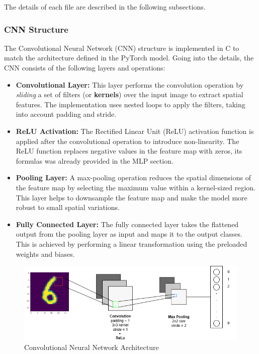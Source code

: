 \documentclass{article}
\begin{document}
The details of each file are described in the following subsections.

\subsubsection{CNN Structure}
The Convolutional Neural Network (CNN) structure is implemented in C to match the architecture defined in the PyTorch model. Going into the details, the CNN consists of the following layers and operations:

\begin{itemize}
    \item \textbf{Convolutional Layer:} This layer performs the convolution operation by \textit{sliding} a set of filters (or \textbf{kernels}) over the input image to extract spatial features. The implementation uses nested loops to apply the filters, taking into account padding and stride.
    \item \textbf{ReLU Activation:} The Rectified Linear Unit (ReLU) activation function is applied after the convolutional operation to introduce non-linearity. The ReLU function replaces negative values in the feature map with zeros, its formulas was already provided in the MLP section.
    \item \textbf{Pooling Layer:} A max-pooling operation reduces the spatial dimensions of the feature map by selecting the maximum value within a kernel-sized region. This layer helps to downsample the feature map and make the model more robust to small spatial variations.
    \item \textbf{Fully Connected Layer:} The fully connected layer takes the flattened output from the pooling layer as input and maps it to the output classes. This is achieved by performing a linear transformation using the preloaded weights and biases.
\end{itemize}


\begin{figure}[H]
    \centering
    \includegraphics[width=1\textwidth]{./assets/ConvNet/convNet.png}
    \caption{Convolutional Neural Network Architecture}
    \label{fig:convolutional-neural-network}
\end{figure}
\end{document}
